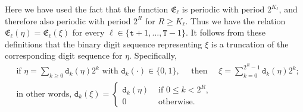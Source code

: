 \documentclass[12pt, twoside]{article}
\theoremstyle{definition}
\numberwithin{equation}{section}
\begin{document}
Here we have used the fact that the function $\mathfrak E_{\ell}$ is periodic with period $2^{K_{\ell}}$, and therefore also periodic with period $2^{R}$ for $R \geq K_{\ell}$. Thus we have the relation $\mathfrak E_{\ell}(\eta) = \mathfrak E_{\ell}(\xi)$ for every $\ell \in \{\mathtt t+1, \ldots, \mathtt T-1 \}$. 
 It follows from these definitions that the binary digit sequence representing $\xi$ is a truncation of the corresponding digit sequence for $\eta$. Specifically, 
\begin{align} 
&\text{if } \eta = \sum_{k \geq 0} \mathtt d_k(\eta) 2^{k} \text{ with } \mathtt d_k(\cdot) \in \{0, 1\}, \quad \text{ then } \quad  \xi = \sum_{k=0}^{2^{R} - 1} \mathtt d_k(\eta) 2^{k}; \label{eta-and-xi}  \\  
&\text{in other words, } \mathtt d_k(\xi) = \begin{cases} \mathtt d_k(\eta) &\text{ if } 0 \leq k < 2^{R}, \\ 0 &\text{ otherwise. }  \end{cases} \nonumber  
\end{align}  
\end{document}
